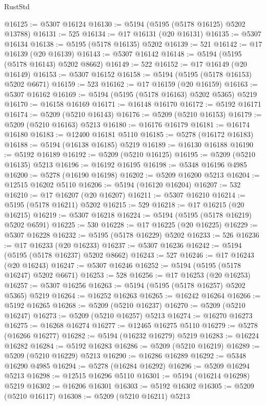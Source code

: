 \begin{lexlean}{RustStd}
\begin{coremodule}
@16125 := @5307 @16124
@16130 := @5194 (@5195 (@5178 @16125) @5202 @13788)
@16131 := 525
@16134 := @17 @16131 (@20 @16131)
@16135 := @5307 @16134
@16138 := @5195 (@5178 @16135) @5202
@16139 := 521
@16142 := @17 @16139 (@20 @16139)
@16143 := @5307 @16142
@16148 := @5194 (@5195 (@5178 @16143) @5202 @8662)
@16149 := 522
@16152 := @17 @16149 (@20 @16149)
@16153 := @5307 @16152
@16158 := @5194 (@5195 (@5178 @16153) @5202 @6671)
@16159 := 523
@16162 := @17 @16159 (@20 @16159)
@16163 := @5307 @16162
@16169 := @5194 (@5195 (@5178 @16163) @5202 @5365) @5219
@16170 := @16158 @16169
@16171 := @16148 @16170
@16172 := @5192 @16171
@16174 := @5209 (@5210 @16143)
@16176 := @5209 (@5210 @16153)
@16179 := @5209 (@5210 @16163) @5213
@16180 := @16176 @16179
@16181 := @16174 @16180
@16183 := @12400 @16181 @5110
@16185 := @5278 (@16172 @16183)
@16188 := @5194 (@16138 @16185) @5219
@16189 := @16130 @16188
@16190 := @5192 @16189
@16192 := @5209 (@5210 @16125)
@16195 := @5209 (@5210 @16135) @5213
@16196 := @16192 @16195
@16198 := @5348 @16196 @4985
@16200 := @5278 (@16190 @16198)
@16202 := @5209 @16200 @5213
@16204 := @12515 @16202 @5110
@16206 := @5194 (@16120 @16204)
@16207 := 532
@16210 := @17 @16207 (@20 @16207)
@16211 := @5307 @16210
@16214 := @5195 (@5178 @16211) @5202
@16215 := 529
@16218 := @17 @16215 (@20 @16215)
@16219 := @5307 @16218
@16224 := @5194 (@5195 (@5178 @16219) @5202 @6591)
@16225 := 530
@16228 := @17 @16225 (@20 @16225)
@16229 := @5307 @16228
@16232 := @5195 (@5178 @16229) @5202
@16233 := 526
@16236 := @17 @16233 (@20 @16233)
@16237 := @5307 @16236
@16242 := @5194 (@5195 (@5178 @16237) @5202 @8662)
@16243 := 527
@16246 := @17 @16243 (@20 @16243)
@16247 := @5307 @16246
@16252 := @5194 (@5195 (@5178 @16247) @5202 @6671)
@16253 := 528
@16256 := @17 @16253 (@20 @16253)
@16257 := @5307 @16256
@16263 := @5194 (@5195 (@5178 @16257) @5202 @5365) @5219
@16264 := @16252 @16263
@16265 := @16242 @16264
@16266 := @5192 @16265
@16268 := @5209 (@5210 @16237)
@16270 := @5209 (@5210 @16247)
@16273 := @5209 (@5210 @16257) @5213
@16274 := @16270 @16273
@16275 := @16268 @16274
@16277 := @12465 @16275 @5110
@16279 := @5278 (@16266 @16277)
@16282 := @5194 (@16232 @16279) @5219
@16283 := @16224 @16282
@16284 := @5192 @16283
@16286 := @5209 (@5210 @16219)
@16289 := @5209 (@5210 @16229) @5213
@16290 := @16286 @16289
@16292 := @5348 @16290 @4985
@16294 := @5278 (@16284 @16292)
@16296 := @5209 @16294 @5213
@16298 := @12515 @16296 @5110
@16301 := @5194 (@16214 @16298) @5219
@16302 := @16206 @16301
@16303 := @5192 @16302
@16305 := @5209 (@5210 @16117)
@16308 := @5209 (@5210 @16211) @5213

\end{coremodule}
\end{lexlean}
